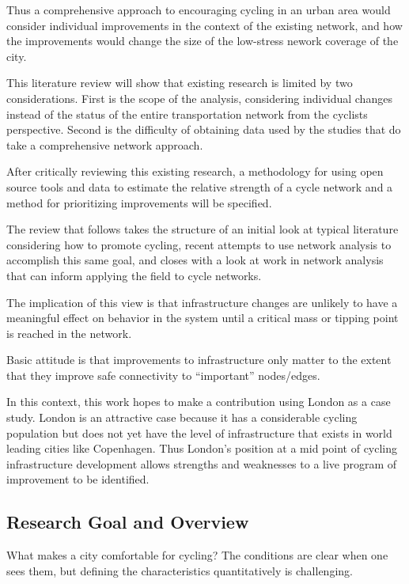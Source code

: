 \documentclass[11pt]{article} %
\begin{document}
Thus a comprehensive approach to encouraging cycling in an urban area would consider individual improvements in the context of the existing network, and how the improvements would change the size of the low-stress nework coverage of the city. 

This literature review will show that existing research is limited by two considerations. First is the scope of the analysis, considering individual changes instead of the status of the entire transportation network from the cyclists perspective.  Second is the difficulty of obtaining data used by the studies that do take a comprehensive network approach. 

After critically reviewing this existing research, a methodology for using open source tools and data to estimate the relative strength of a cycle network and a method for prioritizing improvements will be specified. 

The review that follows takes the structure of an initial look at typical literature considering how to promote cycling, recent attempts to use network analysis to accomplish this same goal, and closes with a look at work in network analysis that can inform applying the field to cycle networks.

 The implication of this view is that infrastructure changes are unlikely to have a meaningful effect on behavior in the system until a critical mass or tipping point is reached in the network. 

Basic attitude is that improvements to infrastructure only matter to the extent that they improve safe connectivity to ``important'' nodes/edges. 

In this context, this work hopes to make a contribution using London as a case study. London is an attractive case because it has a considerable cycling population but does not yet have the level of infrastructure that exists in world leading cities like Copenhagen. Thus London's position at a mid point of cycling infrastructure development allows strengths and weaknesses to a live program of improvement to be identified. 

\subsection{Research Goal and Overview}

What makes a city comfortable for cycling? The conditions are clear when one sees them, but defining the characteristics quantitatively is challenging. 
\end{document}

